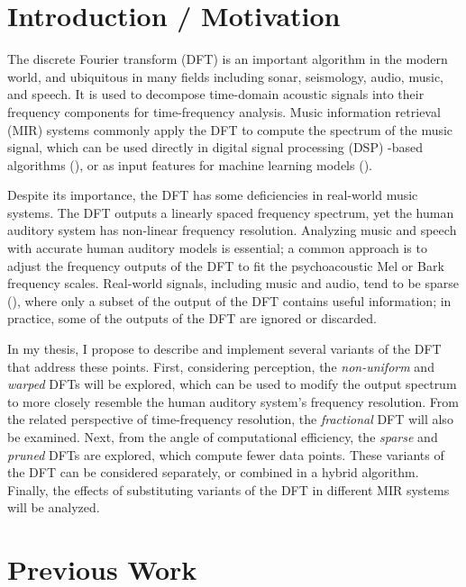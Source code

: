 \documentclass[letter,12pt]{scrartcl}
\title{\ThesisTitle}
\author{Sevag Hanssian, sevag.hanssian@mail.mcgill.ca}
\begin{document}
\maketitle

\section{Introduction / Motivation}

The discrete Fourier transform (DFT) is an important algorithm in the modern world, and ubiquitous in many fields including sonar, seismology, audio, music, and speech. It is used to decompose time-domain acoustic signals into their frequency components for time-frequency analysis. Music information retrieval (MIR) systems commonly apply the DFT to compute the spectrum of the music signal, which can be used directly in digital signal processing (DSP) -based algorithms (\cite{fitzgerald}), or as input features for machine learning models (\cite{musicnn1}).

Despite its importance, the DFT has some deficiencies in real-world music systems. The DFT outputs a linearly spaced frequency spectrum, yet the human auditory system has non-linear frequency resolution. Analyzing music and speech with accurate human auditory models is essential; a common approach is to adjust the frequency outputs of the DFT to fit the psychoacoustic Mel or Bark frequency scales. Real-world signals, including music and audio, tend to be sparse (\cite{sparse}), where only a subset of the output of the DFT contains useful information; in practice, some of the outputs of the DFT are ignored or discarded.

In my thesis, I propose to describe and implement several variants of the DFT that address these points. First, considering perception, the \textit{non-uniform} and \textit{warped} DFTs will be explored, which can be used to modify the output spectrum to more closely resemble the human auditory system's frequency resolution. From the related perspective of time-frequency resolution, the \textit{fractional} DFT will also be examined. Next, from the angle of computational efficiency, the \textit{sparse} and \textit{pruned} DFTs are explored, which compute fewer data points. These variants of the DFT can be considered separately, or combined in a hybrid algorithm. Finally, the effects of substituting variants of the DFT in different MIR systems will be analyzed.

\section{Previous Work}
\end{document}
